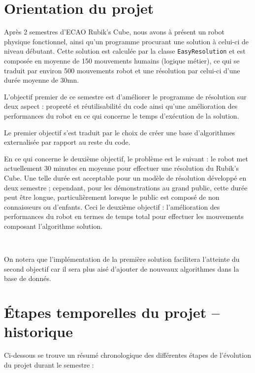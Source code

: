 \section{Orientation du projet}
    Après 2 semestres d'ECAO Rubik's Cube, nous avons à présent un robot physique fonctionnel, ainsi qu'un programme procurant une solution à celui-ci de niveau débutant. Cette solution est calculée par la classe \texttt{EasyResolution} et est composée en moyenne de 150 mouvements humains (logique métier), ce qui se traduit par environ 500 mouvements robot et une résolution par celui-ci d'une durée moyenne de 30mn.
    
    L'objectif premier de ce semestre est d'améliorer le programme de résolution sur deux aspect : propreté et réutilisabilité du code ainsi qu'une amélioration des performances du robot en ce qui concerne le temps d'exécution de la solution.
    
    Le premier objectif s'est traduit par le choix de créer une base d'algorithmes externalisée par rapport au reste du code.
    
    En ce qui concerne le deuxième objectif, le problème est le suivant : le robot met actuellement 30 minutes en moyenne pour effectuer une résolution du Rubik's Cube. Une telle durée est acceptable pour un modèle de résolution développé en deux semestre ; cependant, pour les démonstrations au grand public, cette durée peut être longue, particulièrement lorsque le public est composé de non connaisseurs ou d'enfants. Ceci le deuxième objectif : l'amélioration des performances du robot en termes de temps total pour effectuer les mouvements composant l'algorithme solution.
    
    ~
    
    On notera que l'implémentation de la première solution facilitera l'atteinte du second objectif car il sera plus aisé d'ajouter de nouveaux algorithmes dans la base de donnés.
    
    
\section{Étapes temporelles du projet -- historique}
    Ci-dessous se trouve un résumé chronologique des différentes étapes de l'évolution du projet durant le semestre :
    
    ~
    
